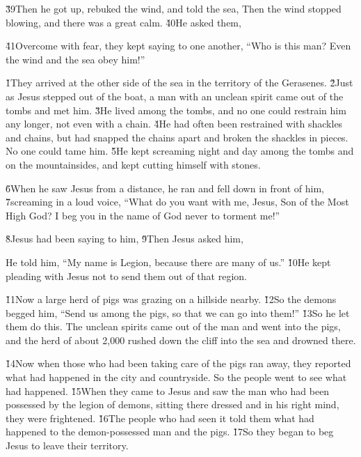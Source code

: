 \v{39}Then he got up, rebuked the wind, and told the sea,  Then the wind stopped blowing, and there was a great calm. \v{40}He asked them, 

\v{41}Overcome with fear, they kept saying to one another, ``Who is this man? Even the wind and the sea obey him!''

\v{1}They arrived at the other side of the sea in the territory of the Gerasenes. \v{2}Just as Jesus stepped out of the boat, a man with an unclean spirit came out of the tombs and met him. \v{3}He lived among the tombs, and no one could restrain him any longer, not even with a chain. \v{4}He had often been restrained with shackles and chains, but had snapped the chains apart and broken the shackles in pieces. No one could tame him. \v{5}He kept screaming night and day among the tombs and on the mountainsides, and kept cutting himself with stones.

\v{6}When he saw Jesus from a distance, he ran and fell down in front of him, \v{7}screaming in a loud voice, ``What do you want with me, Jesus, Son of the Most High God? I beg you in the name of God never to torment me!''

\v{8}Jesus had been saying to him,  \v{9}Then Jesus asked him, 

He told him, ``My name is Legion, because there are many of us.'' \v{10}He kept pleading with Jesus not to send them out of that region.

\v{11}Now a large herd of pigs was grazing on a hillside nearby. \v{12}So the demons begged him, ``Send us among the pigs, so that we can go into them!'' \v{13}So he let them do this. The unclean spirits came out of the man and went into the pigs, and the herd of about 2,000 rushed down the cliff into the sea and drowned there.

\v{14}Now when those who had been taking care of the pigs ran away, they reported what had happened in the city and countryside. So the people went to see what had happened. \v{15}When they came to Jesus and saw the man who had been possessed by the legion of demons, sitting there dressed and in his right mind, they were frightened. \v{16}The people who had seen it told them what had happened to the demon-possessed man and the pigs. \v{17}So they began to beg Jesus to leave their territory.

